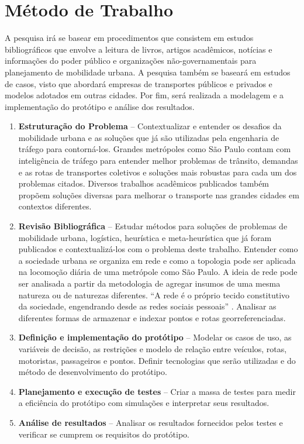 \section{Método de Trabalho}\label{metodo-trabalho}
A pesquisa irá se basear em procedimentos que consistem em estudos bibliográficos que envolve a leitura de livros, artigos acadêmicos, notícias e informações do poder público e organizações não-governamentais para planejamento de mobilidade urbana. A pesquisa também se baseará em estudos de casos, visto que abordará empresas de transportes públicos e privados e modelos adotados em outras cidades. Por fim, será realizada a modelagem e a implementação do protótipo e análise dos resultados.

\begin{enumerate}
\item \textbf{Estruturação do Problema} --
Contextualizar e entender os desafios da mobilidade urbana e as soluções que já são utilizadas pela engenharia de tráfego para contorná-los. Grandes metrópoles como São Paulo contam com inteligência de tráfego para entender melhor problemas de trânsito, demandas e as rotas de transportes coletivos e soluções mais robustas para cada um dos problemas citados. Diversos trabalhos acadêmicos publicados também propõem soluções diversas para melhorar o transporte nas grandes cidades em contextos diferentes.


\item \textbf{Revisão Bibliográfica} --
Estudar métodos para soluções de problemas de mobilidade urbana, logística, heurística e meta-heurística que já foram publicados e contextualizá-los com o problema deste trabalho. Entender como a sociedade urbana se organiza em rede e como a topologia pode ser aplicada na locomoção diária de uma metrópole como São Paulo.  A ideia de rede pode ser analisada a partir da metodologia de agregar insumos de uma mesma natureza ou de naturezas diferentes. ``A rede é o próprio tecido constitutivo da sociedade, engendrando desde as redes sociais pessoais'' \cite{inojosa}. Analisar as diferentes formas de armazenar e indexar pontos e rotas georreferenciadas.

\item \textbf{Definição e implementação do protótipo} --
Modelar os casos de uso, as variáveis de decisão, as restrições e modelo de relação entre veículos, rotas, motoristas, passageiros e pontos. Definir tecnologias que serão utilizadas e do método de desenvolvimento do protótipo.

\item \textbf{Planejamento e execução de testes} --
Criar a massa de testes para medir a eficiência do protótipo com simulações e interpretar seus resultados.

\item \textbf{Análise de resultados} -- 
Analisar os resultados fornecidos pelos testes e verificar se cumprem os requisitos do protótipo.
\end{enumerate}

